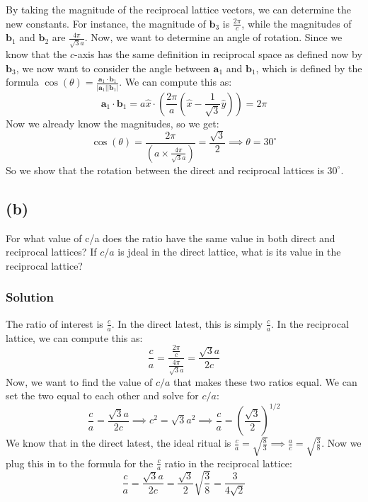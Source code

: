 \documentclass[12pt]{article}
\begin{document}
By taking the magnitude of the reciprocal lattice vectors, we can determine the new constants. For instance, the magnitude of \(\mathbf{b}_3\) is \(\frac{2\pi}{c}\), while the magnitudes of \(\mathbf{b}_1\) and \(\mathbf{b}_2\) are \(\frac{4\pi}{\sqrt{3}a}\). Now, we want to determine an angle of rotation. Since we know that the \(c\)-axis has the same definition in reciprocal space as defined now by \(\mathbf{b}_3\), we now want to consider the angle between \(\mathbf{a}_1\) and \(\mathbf{b}_1\), which is defined by the formula \(\cos(\theta) = \frac{\mathbf{a}_1 \cdot \mathbf{b}_1}{|\mathbf{a}_1||\mathbf{b}_1|}\). We can compute this as:
\begin{equation}
    \mathbf{a}_1 \cdot \mathbf{b}_1 = a \hat{x} \cdot \left(\frac{2\pi}{a} \left(\hat{x} - \frac{1}{\sqrt{3}} \hat{y}\right)\right) = 2\pi
\end{equation}
Now we already know the magnitudes, so we get:
\begin{equation}
    \cos(\theta) = \frac{2\pi}{\left(a \times \frac{4\pi}{\sqrt{3}a}\right)} = \frac{\sqrt{3}}{2} \implies \theta = 30^{\circ}
\end{equation}
So we show that the rotation between the direct and reciprocal lattices is \(30^{\circ}\).
\subsection{(b)}
 For what value of c/a does the ratio have the same value in both direct and reciprocal lattices? If $c / a$ is jdeal in the direct lattice, what is its value in the reciprocal lattice?
\subsubsection{Solution}
The ratio of interest is \(\frac{c}{a}\). In the direct latest, this is simply $\frac{c}{a}$. In the reciprocal lattice, we can compute this as:
\begin{equation}
    \frac{c}{a} = \frac{\frac{2\pi}{c}}{\frac{4\pi}{\sqrt{3}a}} = \frac{\sqrt{3}a}{2c}
\end{equation}
Now, we want to find the value of \(c/a\) that makes these two ratios equal. We can set the two equal to each other and solve for \(c/a\):
\begin{equation}
    \frac{c}{a} = \frac{\sqrt{3}a}{2c} \implies c^2 = \sqrt{3}a^2 \implies \frac{c}{a} = (\frac{\sqrt{3}}{2})^{1/2}
\end{equation}
We know that in the direct latest, the ideal ritual is \(\frac{c}{a} = \sqrt{\frac{8}{3}} \implies \frac{a}{c} = \sqrt{\frac{3}{8}}\). Now we plug this in to the formula for the $\frac{c}{a}$ ratio in the reciprocal lattice:
\begin{equation}
    \frac{c}{a} = \frac{\sqrt{3}a}{2c} = \frac{\sqrt{3}}{2} \sqrt{\frac{3}{8}} = \frac{3}{4\sqrt{2}}
\end{equation}
\end{document}
